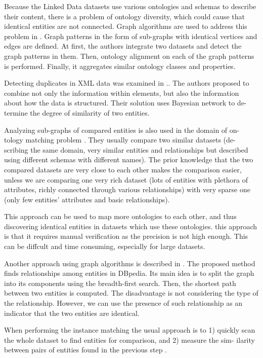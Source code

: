 \documentclass{llncs}
\begin{document}
Because the Linked Data datasets use various ontologies and schemas to describe
their content, there is a problem of ontology diversity, which could cause that
identical entities are not connected. Graph algorithms are used to address this
problem in \cite{zhao2012graph}. Graph patterns in the form of sub-graphs with identical vertices
and edges are defined. At first, the authors integrate two datasets and detect the
graph patterns in them. Then, ontology alignment on each of the graph patterns
is performed. Finally, it aggregates similar ontology classes and properties.

Detecting duplicates in XML data was examined in \cite{leitao2013efficient}.. The authors proposed
to combine not only the information within elements, but also the information
about how the data is structured. Their solution uses Bayesian network to de-
termine the degree of similarity of two entities.

Analyzing sub-graphs of compared entities is also used in the domain of on-
tology matching problem \cite{aumueller2005schema,shvaiko2013ontology}. They usually compare two similar datasets (de-
scribing the same domain, very similar entities and relationships but described
using different schemas with different names). The prior knowledge that the two
compared datasets are very close to each other makes the comparison easier,
unless we are comparing one very rich dataset (lots of entities with plethora of
attributes, richly connected through various relationships) with very sparse one
(only few entities' attributes and basic relationships).

This approach can be used to map more ontologies to each other, and thus
discovering identical entities in datasets which use these ontologies. 
this approach is that it requires manual verification as the precision is not high
enough. This can be diffcult and time consuming, especially for large datasets.

Another approach using graph algorithms is described in \cite{lehmann2007discovering}. The proposed
method finds relationships among entities in DBpedia. Its main idea is to split
the graph into its components using the breadth-first search. Then, the shortest
path between two entities is computed. The disadvantage is not considering the
type of the relationship. However, we can use the presence of such relationship
as an indicator that the two entities are identical.

When performing the instance matching the usual approach is to 1) quickly
scan the whole dataset to find entities for comparison, and 2) measure the sim-
ilarity between pairs of entities found in the previous step \cite{volz2009silk,ngomo2011limes}.
\end{document}
